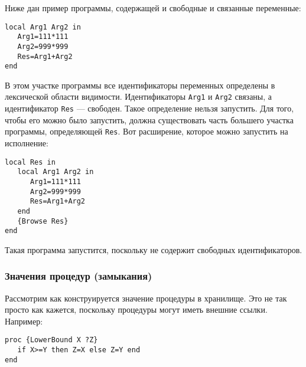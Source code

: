 Ниже дан пример программы, содержащей и свободные и связанные переменные:

\begin{table}
\end{table}

\begin{lstlisting}
local Arg1 Arg2 in
   Arg1=111*111
   Arg2=999*999
   Res=Arg1+Arg2
end
\end{lstlisting}

В этом участке программы все идентификаторы переменных определены в лексической области видимости. Идентификаторы \lstinline|Arg1| и \lstinline|Arg2| связаны, а идентификатор \lstinline|Res| --- свободен. Такое определение нельзя запустить. Для того, чтобы его можно было запустить, должна существовать часть большего участка программы, определяющей \lstinline|Res|. Вот расширение, которое можно запустить на исполнение:

\begin{lstlisting}
local Res in
   local Arg1 Arg2 in
      Arg1=111*111
      Arg2=999*999
      Res=Arg1+Arg2
   end
   {Browse Res}
end
\end{lstlisting}

Такая программа запустится, поскольку не содержит свободных идентификаторов.


\subsubsection{Значения процедур (замыкания)}

Рассмотрим как конструируется значение процедуры в хранилище. Это не так просто как кажется, поскольку процедуры могут иметь внешние ссылки. Например:

\begin{lstlisting}
proc {LowerBound X ?Z}
   if X>=Y then Z=X else Z=Y end
end
\end{lstlisting}

